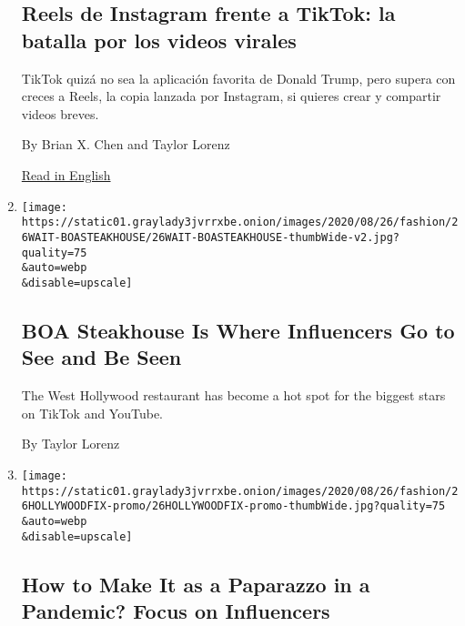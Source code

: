 \begin{enumerate}
  \hypertarget{reels-de-instagram-frente-a-tiktok-la-batalla-por-los-videos-virales}{%
  \subsection{Reels de Instagram frente a TikTok: la batalla por los
  videos
  virales}\label{reels-de-instagram-frente-a-tiktok-la-batalla-por-los-videos-virales}}

  TikTok quizá no sea la aplicación favorita de Donald Trump, pero
  supera con creces a Reels, la copia lanzada por Instagram, si quieres
  crear y compartir videos breves.

  By Brian X. Chen and Taylor Lorenz

  \href{https://www.nytimes3xbfgragh.onion/2020/08/12/technology/personaltech/tested-facebook-reels-tiktok-clone-dud.html}{Read
  in English}
\item
  \href{/2020/08/26/style/boa-steakhouse-tiktok-youtube.html}{}

  \texttt{[image: https://static01.graylady3jvrrxbe.onion/images/2020/08/26/fashion/26WAIT-BOASTEAKHOUSE/26WAIT-BOASTEAKHOUSE-thumbWide-v2.jpg?quality=75\\\&auto=webp\\\&disable=upscale]}

  \hypertarget{boa-steakhouse-is-where-influencers-go-to-see-and-be-seen}{%
  \subsection{BOA Steakhouse Is Where Influencers Go to See and Be
  Seen}\label{boa-steakhouse-is-where-influencers-go-to-see-and-be-seen}}

  The West Hollywood restaurant has become a hot spot for the biggest
  stars on TikTok and YouTube.

  By Taylor Lorenz
\item
  \href{/2020/08/25/style/hollywood-fix-influencer-videos.html}{}

  \texttt{[image: https://static01.graylady3jvrrxbe.onion/images/2020/08/26/fashion/26HOLLYWOODFIX-promo/26HOLLYWOODFIX-promo-thumbWide.jpg?quality=75\\\&auto=webp\\\&disable=upscale]}

  \hypertarget{how-to-make-it-as-a-paparazzo-in-a-pandemic-focus-on-influencers}{%
  \subsection{How to Make It as a Paparazzo in a Pandemic? Focus on
  Influencers}\label{how-to-make-it-as-a-paparazzo-in-a-pandemic-focus-on-influencers}}


\end{enumerate}
